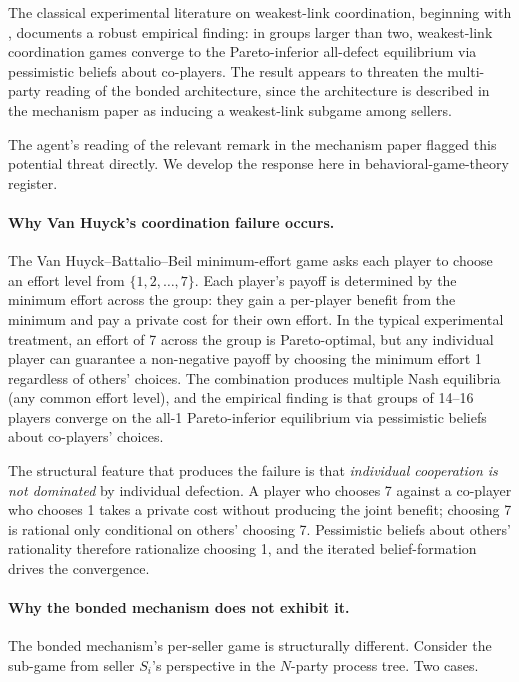 \documentclass[11pt,a4paper]{article}
\theoremstyle{definition}
\theoremstyle{remark}
\begin{document}
The classical experimental literature on weakest-link coordination,
beginning with \citet{vanhuyck_battalio_beil_1990}, documents a
robust empirical finding: in groups larger than two, weakest-link
coordination games converge to the Pareto-inferior all-defect
equilibrium via pessimistic beliefs about co-players. The result
appears to threaten the multi-party reading of the bonded
architecture, since the architecture is described in the mechanism
paper as inducing a weakest-link subgame among sellers.

The agent's reading of the relevant remark in the mechanism paper
flagged this potential threat directly. We develop the response
here in behavioral-game-theory register.

\paragraph{Why Van Huyck's coordination failure occurs.}
The Van Huyck--Battalio--Beil minimum-effort game asks each player
to choose an effort level from $\{1, 2, \ldots, 7\}$. Each player's
payoff is determined by the minimum effort across the group: they
gain a per-player benefit from the minimum and pay a private cost
for their own effort. In the typical experimental treatment, an
effort of 7 across the group is Pareto-optimal, but any individual
player can guarantee a non-negative payoff by choosing the minimum
effort 1 regardless of others' choices. The combination produces
multiple Nash equilibria (any common effort level), and the
empirical finding is that groups of 14--16 players converge on the
all-1 Pareto-inferior equilibrium via pessimistic beliefs about
co-players' choices.

The structural feature that produces the failure is that
\emph{individual cooperation is not dominated} by individual
defection. A player who chooses 7 against a co-player who chooses 1
takes a private cost without producing the joint benefit; choosing
7 is rational only conditional on others' choosing 7. Pessimistic
beliefs about others' rationality therefore rationalize choosing
1, and the iterated belief-formation drives the convergence.

\paragraph{Why the bonded mechanism does not exhibit it.}
The bonded mechanism's per-seller game is structurally different.
Consider the sub-game from seller $S_i$'s perspective in the
$N$-party process tree. Two cases.
\end{document}
